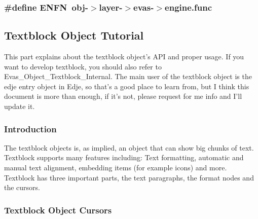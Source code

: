 \subsubsection[{ENFN}]{\setlength{\rightskip}{0pt plus 5cm}\#define ENFN~obj-\/$>$layer-\/$>$evas-\/$>$engine.func}\label{group__Evas__Object__Textblock_gac8ab2a94f6b027a2b24fffdd23b113fb}
\hypertarget{group__Evas__Object__Textblock_Evas_Object_Textblock_Tutorial}{}\subsection{Textblock Object Tutorial}\label{group__Evas__Object__Textblock_Evas_Object_Textblock_Tutorial}
This part explains about the textblock object's API and proper usage. If you want to develop textblock, you should also refer to Evas\_\-Object\_\-Textblock\_\-Internal. The main user of the textblock object is the edje entry object in Edje, so that's a good place to learn from, but I think this document is more than enough, if it's not, please request for me info and I'll update it.\hypertarget{group__Evas__Object__Textblock_textblock_intro}{}\subsubsection{Introduction}\label{group__Evas__Object__Textblock_textblock_intro}
The textblock objects is, as implied, an object that can show big chunks of text. Textblock supports many features including: Text formatting, automatic and manual text alignment, embedding items (for example icons) and more. Textblock has three important parts, the text paragraphs, the format nodes and the cursors.\hypertarget{group__Evas__Object__Textblock_textblock_cursors}{}\subsubsection{Textblock Object Cursors}\label{group__Evas__Object__Textblock_textblock_cursors}
